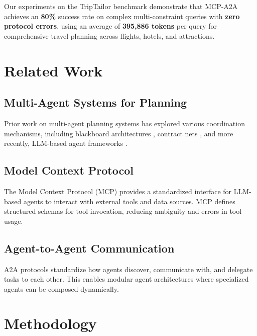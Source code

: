 \documentclass[11pt,a4paper]{article}
\begin{document}
Our experiments on the TripTailor benchmark demonstrate that MCP-A2A achieves an \textbf{80\%} success rate on complex multi-constraint queries with \textbf{zero protocol errors}, using an average of \textbf{395,886 tokens} per query for comprehensive travel planning across flights, hotels, and attractions.

\section{Related Work}

\subsection{Multi-Agent Systems for Planning}
Prior work on multi-agent planning systems has explored various coordination mechanisms, including blackboard architectures \cite{hayes1985blackboard}, contract nets \cite{smith1980contract}, and more recently, LLM-based agent frameworks \cite{wu2023autogen, hong2023metagpt}.

\subsection{Model Context Protocol}
The Model Context Protocol (MCP) provides a standardized interface for LLM-based agents to interact with external tools and data sources. MCP defines structured schemas for tool invocation, reducing ambiguity and errors in tool usage.

\subsection{Agent-to-Agent Communication}
A2A protocols standardize how agents discover, communicate with, and delegate tasks to each other. This enables modular agent architectures where specialized agents can be composed dynamically.

\section{Methodology}
\end{document}

